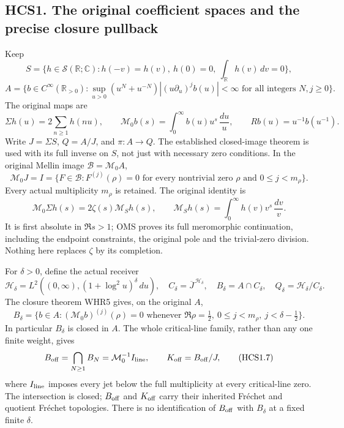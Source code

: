 \subsection{HCS1. The original coefficient spaces and the precise
closure
pullback}\label{hcs1.-the-original-coefficient-spaces-and-the-precise-closure-pullback}

Keep \[
S=\{h\in\mathcal S(\mathbb R;\mathbb C):
h(-v)=h(v),\ h(0)=0,\ \int_{\mathbb R}h(v)\,dv=0\},
\] \[
A=\{b\in C^\infty(\mathbb R_{>0}):
\sup_{u>0}(u^N+u^{-N})|(u\partial_u)^jb(u)|<\infty
\text{ for all integers }N,j\ge0\}.
\tag{HCS1.1}
\] The original maps are \[
\Sigma h(u)=2\sum_{n\ge1}h(nu),\qquad
\mathcal M_0b(s)=\int_0^\infty b(u)u^s\,\frac{du}{u},
\qquad Rb(u)=u^{-1}b(u^{-1}).
\tag{HCS1.2}
\] Write \(J=\Sigma S\), \(Q=A/J\), and \(\pi:A\to Q\). The established
closed-image theorem is used with its full inverse on \(S\), not just
with necessary zero conditions. In the original Mellin image
\(\mathcal B=\mathcal M_0A\), \[
\mathcal M_0J=I
=\{F\in\mathcal B:F^{(j)}(\rho)=0
\text{ for every nontrivial zero }\rho
\text{ and }0\le j<m_\rho\}.
\tag{HCS1.3}
\] Every actual multiplicity \(m_\rho\) is retained. The original
identity is \[
\mathcal M_0\Sigma h(s)=2\zeta(s)\mathcal M_Sh(s),\qquad
\mathcal M_Sh(s)=\int_0^\infty h(v)v^s\,\frac{dv}{v}.
\tag{HCS1.4}
\] It is first absolute in \(\Re s>1\); OMS proves its full meromorphic
continuation, including the endpoint constraints, the original pole and
the trivial-zero division. Nothing here replaces \(\zeta\) by its
completion.

For \(\delta>0\), define the actual receiver \[
\mathcal H_\delta=L^2\!\left((0,\infty),
(1+\log^2u)^\delta\,du\right),\quad
C_\delta=\overline J^{\,\mathcal H_\delta},\quad
B_\delta=A\cap C_\delta,\quad Q_\delta=\mathcal H_\delta/C_\delta.
\tag{HCS1.5}
\] The closure theorem WHR5 gives, on the original \(A\), \[
B_\delta=\{b\in A:
(\mathcal M_0b)^{(j)}(\rho)=0
\text{ whenever }\Re\rho=\tfrac12,\
0\le j<m_\rho,\ j<\delta-\tfrac12\}.
\tag{HCS1.6}
\] In particular \(B_\delta\) is closed in \(A\). The whole
critical-line family, rather than any one finite weight, gives \[
B_{\rm off}=\bigcap_{N\ge1}B_N
=\mathcal M_0^{-1}I_{\rm line},\qquad
K_{\rm off}=B_{\rm off}/J,
\tag{HCS1.7}
\] where \(I_{\rm line}\) imposes every jet below the full multiplicity
at every critical-line zero. The intersection is closed; \(B_{\rm off}\)
and \(K_{\rm off}\) carry their inherited Fréchet and quotient Fréchet
topologies. There is no identification of \(B_{\rm off}\) with
\(B_\delta\) at a fixed finite \(\delta\).

